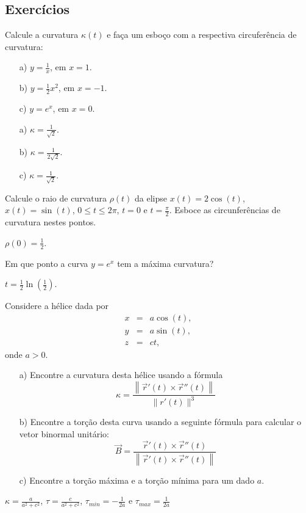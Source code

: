 \subsection*{Exercícios}
\begin{exer}
 Calcule a curvatura $\kappa(t)$ e faça um esboço com a respectiva circuferência de curvatura:
 \begin{itemize}
  \item[a)] $y=\frac{1}{x}$, em $x=1$. 
  \item[b)] $y=\frac{1}{2}x^2$, em $x=-1$.
  \item[c)] $y=e^x$, em $x=0$.
 \end{itemize}
 \end{exer}
\begin{resp}
 \begin{itemize}
  \item[a)] $\kappa=\frac{1}{\sqrt{2}}$.
  \item[b)] $\kappa=\frac{1}{2\sqrt{2}}$.
  \item[c)] $\kappa=\frac{1}{\sqrt{2}}$.
 \end{itemize}

\end{resp}

\begin{exer}
 Calcule o raio de curvatura $\rho(t)$ da elipse $x(t)=2\cos(t)$, $x(t)=\sin(t)$, $0\leq t\leq2\pi$, $t=0$ e $t=\frac{\pi}{2}$. Esboce as circunferências de curvatura nestes pontos.
\end{exer}
\begin{resp}
 $\rho(0)=\frac{1}{2}$.
\end{resp}
\begin{exer}
Em que ponto a curva $y=e^x$ tem a máxima curvatura?
\end{exer}
\begin{resp}
 $t=\frac{1}{2}\ln\left(\frac{1}{2}\right)$.
\end{resp}


\begin{exer} Considere a hélice dada por
\begin{eqnarray*}
x&=&a\cos(t),\\
y&=&a\sin(t),\\
z&=&ct,
\end{eqnarray*}
onde $a>0$.
\begin{itemize}
\item[a)] Encontre  a curvatura desta hélice usando a fórmula
$$\kappa=\frac{\left\|\vec{r}'(t)\times \vec{r}''(t)\right\|}{\|r'(t)\|^3}$$
\item[b)] Encontre a torção desta curva usando a seguinte fórmula para calcular o vetor binormal unitário: $$\vec{B}=\frac{\vec{r}'(t)\times \vec{r}''(t)}{\left\|\vec{r}'(t)\times \vec{r}''(t)\right\|}$$
\item[c)] Encontre a torção máxima e a torção mínima para um dado $a$. 
\end{itemize}
\end{exer}
\begin{resp}
 $\kappa= \frac{a}{a^2+c^2}$, $\tau = \frac{c}{a^2+c^2}$, $\tau_{min} = -\frac{1}{2a}$ e $\tau_{max} = \frac{1}{2a}$ 
\end{resp}


